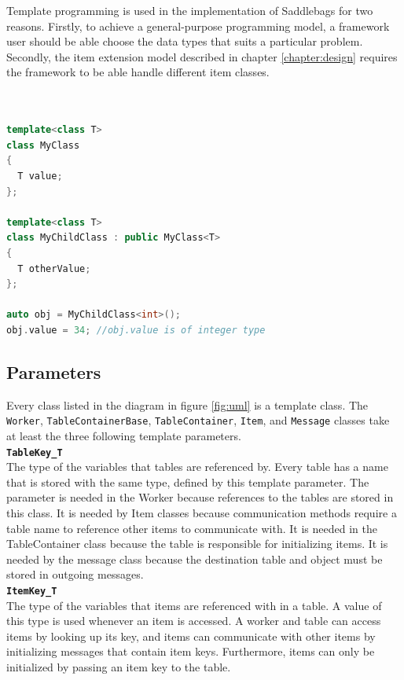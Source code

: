 \documentclass{uit-report}
\begin{document}
Template programming is used in the implementation of Saddlebags for two reasons. Firstly, to achieve a general-purpose programming model, a framework user should be able choose the data types that suits a particular problem. Secondly, the item extension model described in chapter \ref{chapter:design} requires the framework to be able handle different item classes.
\\ \\
\begin{lstlisting}[label={lst:template}, float=h,frame=tlrb, caption={Declaration and initialization of an inherited template class in C++}, captionpos=t, language=c++, showstringspaces=false]

template<class T>
class MyClass
{
  T value;
};

template<class T>
class MyChildClass : public MyClass<T>
{
  T otherValue;
};

auto obj = MyChildClass<int>();
obj.value = 34; //obj.value is of integer type
\end{lstlisting}
\newpage
\subsection{Parameters}

Every class listed in the diagram in figure \ref{fig:uml} is a template class. The \texttt{Worker}, \texttt{TableContainerBase}, \texttt{TableContainer}, \texttt{Item}, and \texttt{Message} classes take at least the three following template parameters.
\\

\hspace{4ex} \textbf{\texttt{TableKey\_T}}
\\
The type of the variables that tables are referenced by. Every table has a name that is stored with the same type, defined by this template parameter. The parameter is needed in the Worker because references to the tables are stored in this class. It is needed by Item classes because communication methods require a table name to reference other items to communicate with. It is needed in the TableContainer class because the table is responsible for initializing items. It is needed by the message class because the destination table and object must be stored in outgoing messages.
\\
 
\hspace{4ex} \textbf{\texttt{ItemKey\_T}}
\\
The type of the variables that items are referenced with in a table. A value of this type is used whenever an item is accessed. A worker and table can access items by looking up its key, and items can communicate with other items by initializing messages that contain item keys. Furthermore, items can only be initialized by passing an item key to the table.
\\
\end{document}
